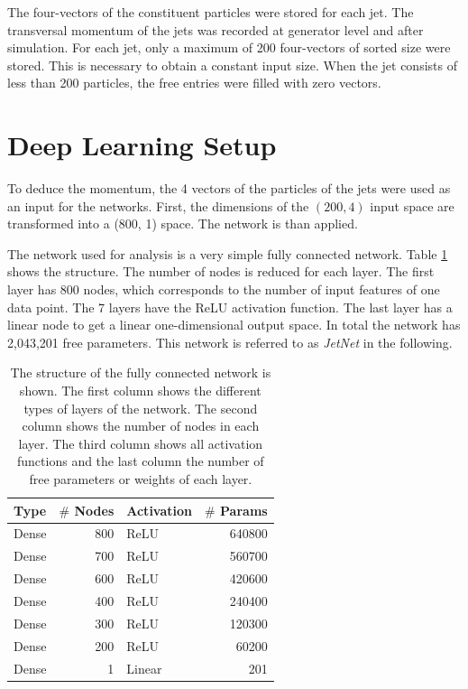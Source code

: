 \documentclass[12pt, a4paper]{thesis}
\begin{document}
The four-vectors of the constituent particles were stored for each
jet. The transversal momentum of the jets was recorded at generator
level and after simulation. For each jet, only a maximum of 200
four-vectors of sorted size were stored. This is necessary to obtain a
constant input size. When the jet consists of less than 200 particles,
the free entries were filled with zero vectors.

\section{Deep Learning Setup}
\label{sec:orgf3b24cc}

To deduce the momentum, the 4 vectors of the particles of the jets
were used as an input for the networks. First, the dimensions of the
\((200, 4)\) input space are transformed into a (800, 1) space. The
network is than applied.

The network used for analysis is a very simple fully connected
network.  Table \ref{jet_fcn_structure} shows the structure. The number
of nodes is reduced for each layer.  The first layer has 800 nodes,
which corresponds to the number of input features of one data
point. The 7 layers have the ReLU activation function. The last layer
has a linear node to get a linear one-dimensional output space. In
total the network has 2,043,201 free parameters. This network is
referred to as \emph{JetNet} in the following.

\begin{table}[htbp]
  \centering
  \begin{tabular}{lrlr}
    Type & \(\#\) Nodes & Activation & \(\#\) Params\\
    \hline
    Dense & 800 & ReLU & 640800\\
    Dense & 700 & ReLU & 560700\\
    Dense & 600 & ReLU & 420600\\
    Dense & 400 & ReLU & 240400\\
    Dense & 300 & ReLU & 120300\\
    Dense & 200 & ReLU & 60200\\
    Dense & 1 & Linear & 201\\
  \end{tabular}
  \caption{The structure of the fully connected network is shown. The
    first column shows the different types of layers of the
    network. The second column shows the number of nodes in each
    layer. The third column shows all activation functions and the
    last column the number of free parameters or weights of each
    layer.}
  \label{jet_fcn_structure}
\end{table}
\end{document}
